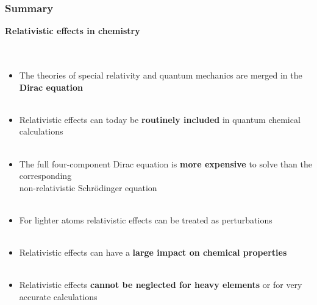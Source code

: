 \documentclass[mathserif,8pt]{beamer}
\begin{document}
\begin{frame}
    \frametitle{Summary}
    \textbf{Relativistic effects in chemistry}\\
    \ \\
    \ \\
    \begin{itemize}
	\item	The theories of special relativity and quantum mechanics are merged
		in the \textbf{Dirac equation}\\
		\ \\
	\item	Relativistic effects can today be \textbf{routinely included} in quantum chemical 
		calculations\\
		\ \\
	\item	The full four-component Dirac equation is \textbf{more expensive} to solve 
		than the corresponding\\
		non-relativistic Schr\"{o}dinger equation\\
		\ \\
	\item	For lighter atoms relativistic effects can be treated as perturbations\\
		\ \\
	\item	Relativistic effects can have a \textbf{large impact on chemical properties}\\
		\ \\
	\item	Relativistic effects \textbf{cannot be neglected for heavy elements} or for very 
		accurate calculations
    \end{itemize}
\end{frame}
\end{document}
